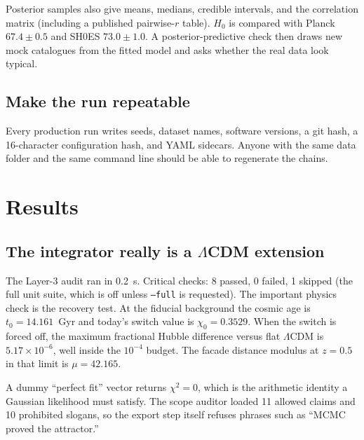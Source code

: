 \documentclass[12pt,letterpaper]{article}
\begin{document}
Posterior samples also give means, medians, credible intervals, and
the correlation matrix (including a published pairwise-$r$ table).
$H_0$ is compared with Planck $67.4\pm 0.5$ and SH0ES $73.0\pm 1.0$.
A posterior-predictive check then draws new mock catalogues from the
fitted model and asks whether the real data look typical.

\subsection{Make the run repeatable}

Every production run writes seeds, dataset names, software versions,
a git hash, a 16-character configuration hash, and YAML sidecars.
Anyone with the same data folder and the same command line should be
able to regenerate the chains.

\section{Results}

\subsection{\texorpdfstring{The integrator really is a $\Lambda$CDM extension}{The integrator really is a LambdaCDM extension}}

The Layer-3 audit ran in 0.2~s. Critical checks: 8 passed, 0 failed,
1 skipped (the full unit suite, which is off unless
\texttt{--full} is requested). The important physics check is the
recovery test. At the fiducial background the cosmic age is
$t_0=14.161$~Gyr and today's switch value is $\chi_0=0.3529$. When the
switch is forced off, the maximum fractional Hubble difference versus
flat $\Lambda$CDM is $5.17\times 10^{-6}$, well inside the
$10^{-4}$ budget. The facade distance modulus at $z=0.5$ in that
limit is $\mu=42.165$.

A dummy ``perfect fit'' vector returns $\chi^2=0$, which is the
arithmetic identity a Gaussian likelihood must satisfy. The scope
auditor loaded 11 allowed claims and 10 prohibited slogans, so the
export step itself refuses phrases such as ``MCMC proved the
attractor.''
\end{document}
